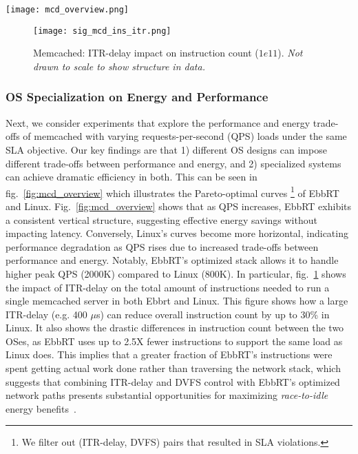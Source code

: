\begin{figure*}[!htb]
\centering
\texttt{[image: mcd\_overview.png]}
\caption[]
{\small Memcached: Each point represents a single experimental run. The \textit{*-static} data points use a unique (ITR-delay, DVFS) pair. We only illustrate data that lie on the Pareto-optimal curve. The X-axis shows performance measurement (lower is better) and the Y-axis shows total energy consumed.
\textit{Linux results for 1000K and 1500K QPS loads are not shown as Linux could not support them without violating SLA.}
}
\label{fig:mcd_overview}
\end{figure*}

\begin{figure}[!htb]
\texttt{[image: sig\_mcd\_ins\_itr.png]}
\caption[]{\small Memcached: ITR-delay impact on instruction count ($1e11$). 
\textit{Not drawn to scale to show structure in data.}
}
\label{fig:sig_mcd_ins_itr}
\end{figure}

\subsubsection{OS Specialization on Energy and Performance}
\label{sec:open1}
Next, we consider experiments that explore the performance and energy trade-offs of memcached with varying requests-per-second (QPS) loads under the same SLA objective. Our key findings are that 1) different OS designs can impose different trade-offs between performance and energy, and 2) specialized systems can achieve dramatic efficiency in both. This can be seen in fig.~\ref{fig:mcd_overview} which illustrates the Pareto-optimal curves \footnote{We filter out (ITR-delay, DVFS) pairs that resulted in SLA violations.} of EbbRT and Linux. Fig.~\ref{fig:mcd_overview} shows that as QPS increases, EbbRT exhibits a consistent vertical structure, suggesting effective energy savings without impacting latency. Conversely, Linux's curves become more horizontal, indicating performance degradation as QPS rises due to increased trade-offs between performance and energy. Notably, EbbRT's optimized stack allows it to handle higher peak QPS (2000K) compared to Linux (800K). In particular, fig.~\ref{fig:sig_mcd_ins_itr} shows the impact of ITR-delay on the total amount of instructions needed to run a single memcached server in both Ebbrt and Linux. This figure shows how a large ITR-delay (e.g. 400 $\mu$s) can reduce overall instruction count by up to 30\% in Linux. It also shows the drastic differences in instruction count between the two OSes, as EbbRT uses up to 2.5X fewer instructions to support the same load as Linux does. This implies that a greater fraction of EbbRT's instructions were spent getting actual work done rather than traversing the network stack, which suggests that combining ITR-delay and DVFS control with EbbRT's optimized network paths presents substantial opportunities for maximizing \textit{race-to-idle} energy benefits~\cite{dreamweaver, dynsleep}.

